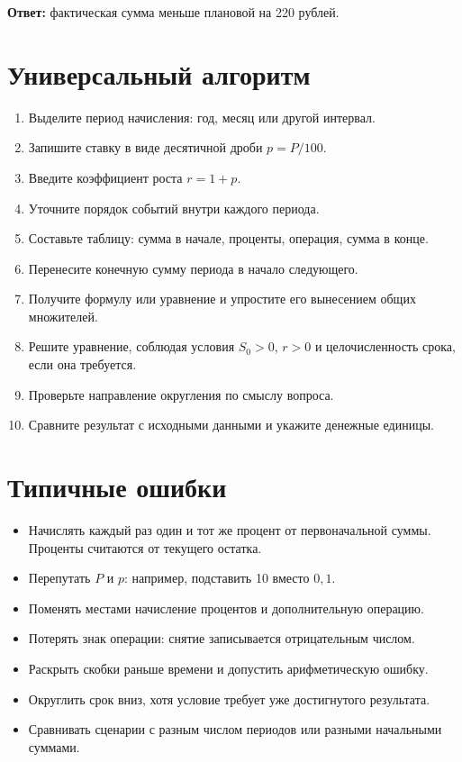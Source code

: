 \documentclass[a4paper,12pt]{article}
\newcommand{\term}[1]{\textcolor{darkaccent}{\textbf{#1}}}
\begin{document}
\term{Ответ:} фактическая сумма меньше плановой на 220 рублей.

\section{Универсальный алгоритм}

\begin{enumerate}
  \item Выделите период начисления: год, месяц или другой интервал.
  \item Запишите ставку в виде десятичной дроби $p=P/100$.
  \item Введите коэффициент роста $r=1+p$.
  \item Уточните порядок событий внутри каждого периода.
  \item Составьте таблицу: сумма в начале, проценты, операция, сумма в конце.
  \item Перенесите конечную сумму периода в начало следующего.
  \item Получите формулу или уравнение и упростите его вынесением общих множителей.
  \item Решите уравнение, соблюдая условия $S_0>0$, $r>0$ и целочисленность срока, если она требуется.
  \item Проверьте направление округления по смыслу вопроса.
  \item Сравните результат с исходными данными и укажите денежные единицы.
\end{enumerate}

\section{Типичные ошибки}

\begin{itemize}
  \item Начислять каждый раз один и тот же процент от первоначальной суммы. Проценты считаются от текущего остатка.
  \item Перепутать $P$ и $p$: например, подставить 10 вместо $0{,}1$.
  \item Поменять местами начисление процентов и дополнительную операцию.
  \item Потерять знак операции: снятие записывается отрицательным числом.
  \item Раскрыть скобки раньше времени и допустить арифметическую ошибку.
  \item Округлить срок вниз, хотя условие требует уже достигнутого результата.
  \item Сравнивать сценарии с разным числом периодов или разными начальными суммами.
\end{itemize}
\end{document}
